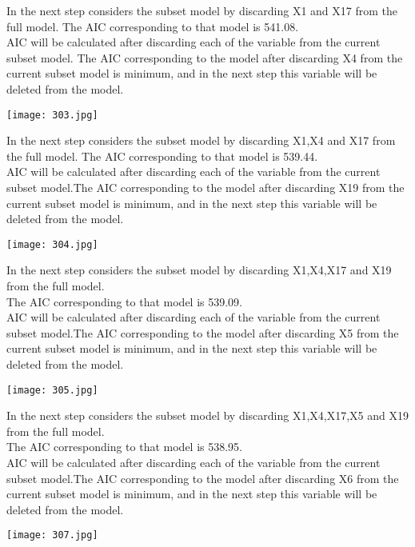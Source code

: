 \documentclass[a4paper,12pt,twoside]{book}
\begin{document}
In the next step considers the subset model by discarding X1 and X17 from the full model. The AIC corresponding to that model is 541.08.\\
AIC will be calculated after discarding each of the variable from the current subset model. The AIC corresponding to the model after discarding X4 from the current subset model is minimum, and in the next step this variable will be deleted from the model.\\
\begin{center}
\texttt{[image: 303.jpg]}\\
\end{center}
In the next step considers the subset model by discarding X1,X4 and X17 from the full model. The AIC corresponding to that model is 539.44.\\
AIC will be calculated after discarding each of the variable from the current subset model.The AIC corresponding to the model after discarding X19 from the current subset model is minimum, and in the next step this
variable will be deleted from the model.\\
\begin{center}
\texttt{[image: 304.jpg]}\\
\end{center}
In the next step considers the subset model by discarding X1,X4,X17 and X19 from the full model.\\
The AIC corresponding to that model is 539.09.\\
AIC will be calculated after discarding each of the variable from the current subset model.The AIC corresponding to the model after discarding X5 from the current subset model is minimum, and in the next step this
variable will be deleted from the model.\\
\begin{center}
\texttt{[image: 305.jpg]}\\
\end{center}
In the next step considers the subset model by discarding X1,X4,X17,X5 and X19 from the full model.\\
The AIC corresponding to that model is 538.95.\\
AIC will be calculated after discarding each of the variable from the current subset model.The AIC corresponding to the model after discarding X6 from the current subset model is minimum, and in the next step this
variable will be deleted from the model.\\
\begin{center}
\texttt{[image: 307.jpg]}\\
\end{center}
\end{document}
